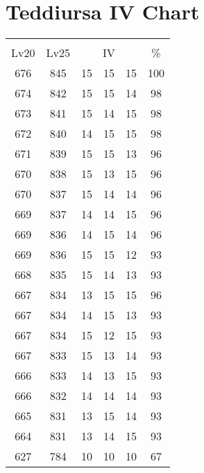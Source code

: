 \documentclass{article}%
\begin{document}
%
\normalsize%
\section{Teddiursa IV Chart}%
\label{sec:Teddiursa IV Chart}%
\renewcommand{\arraystretch}{1.5}%
\begin{tabular}{|c|c|c|c|c|c|}%
\hline%
\multicolumn{6}{|c|}{\textcolor{white}{ 
\linebreak{Teddiursa}
}%
\cellcolor{black}}\\%
\multicolumn{1}{|c}{Lv20}&\multicolumn{1}{c|}{Lv25}&\multicolumn{3}{c|}{IV}&\multicolumn{1}{|c|}{\%}\\%
\hline%
\rowcolor{color100}%
676&845&15&15&15&100\\%
\hline%
\rowcolor{color98}%
674&842&15&15&14&98\\%
\hline%
\rowcolor{color98}%
673&841&15&14&15&98\\%
\hline%
\rowcolor{color98}%
672&840&14&15&15&98\\%
\hline%
\rowcolor{color96}%
671&839&15&15&13&96\\%
\hline%
\rowcolor{color96}%
670&838&15&13&15&96\\%
\hline%
\rowcolor{color96}%
670&837&15&14&14&96\\%
\hline%
\rowcolor{color96}%
669&837&14&14&15&96\\%
\hline%
\rowcolor{color96}%
669&836&14&15&14&96\\%
\hline%
\rowcolor{color93}%
669&836&15&15&12&93\\%
\hline%
\rowcolor{color93}%
668&835&15&14&13&93\\%
\hline%
\rowcolor{color96}%
667&834&13&15&15&96\\%
\hline%
\rowcolor{color93}%
667&834&14&15&13&93\\%
\hline%
\rowcolor{color93}%
667&834&15&12&15&93\\%
\hline%
\rowcolor{color93}%
667&833&15&13&14&93\\%
\hline%
\rowcolor{color93}%
666&833&14&13&15&93\\%
\hline%
\rowcolor{color93}%
666&832&14&14&14&93\\%
\hline%
\rowcolor{color93}%
665&831&13&15&14&93\\%
\hline%
\rowcolor{color93}%
664&831&13&14&15&93\\%
\hline%
\rowcolor{color91}%
627&784&10&10&10&67\\%
\end{tabular}

%
\end{document}
